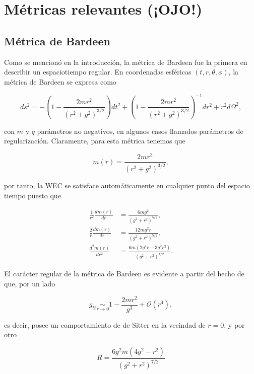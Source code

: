 \documentclass{article}
\numberwithin{equation}{section}
\begin{document}
\section{\label{previous metrics} Métricas relevantes (¡OJO!)}

\subsection{\label{bardeen section} Métrica de Bardeen}

Como se mencionó en la introducción, la métrica de Bardeen \cite{bardeen} fue la primera en describir un espaciotiempo regular. En coordenadas esféricas $(t,r,\theta,\phi)$, la métrica de Bardeen se expresa como

\begin{equation}
\label{bardeen metric}
ds^2 = -\left( 1 - \frac{2mr^2}{(r^2 + g^2)^{3/2}} \right)dt^2 + \left( 1 - \frac{2mr^2}{(r^2 + g^2)^{3/2}} \right)^{-1}dr^2 + r^2d\Omega^2,
\end{equation}

con $m$ y $q$ parámetros no negativos, en algunos casos llamados parámetros de regularización. Claramente, para esta métrica tenemos que 

\begin{equation}
m(r) = \frac{2mr^3}{(r^2 + g^2)^{3/2}},
\end{equation}

por tanto, la WEC se satisface automáticamente en cualquier punto del espacio tiempo puesto que 

\begin{align}
\frac{1}{r^2}\frac{dm(r)}{dr} &= \frac{6 m g^2}{\left(g^2+r^2\right)^{5/2}},\\
\frac{2}{r}\frac{dm(r)}{dr} &= \frac{12 m g^2 r}{\left(g^2+r^2\right)^{5/2}},\\
\frac{d^2m(r)}{dr^2} &= \frac{6 m \left(2 g^4 r-3 g^2 r^3\right)}{\left(g^2+r^2\right)^{7/2}}.
\end{align}

El carácter regular de la métrica de Bardeen es evidente a partir del hecho de que, por un lado

\begin{equation}
g_{tt} \underset{r \to 0}{\sim} 1 - \frac{2mr^2}{g^3} + \mathcal{O}(r^4),
\end{equation}

es decir, posee un comportamiento de de Sitter en la vecindad de $r = 0$, y por otro

\begin{equation}
\label{bardeen scalar}
R = \frac{6 g^2 m \left(4 g^2-r^2\right)}{\left(g^2+r^2\right)^{7/2}}
\end{equation}
\end{document}
